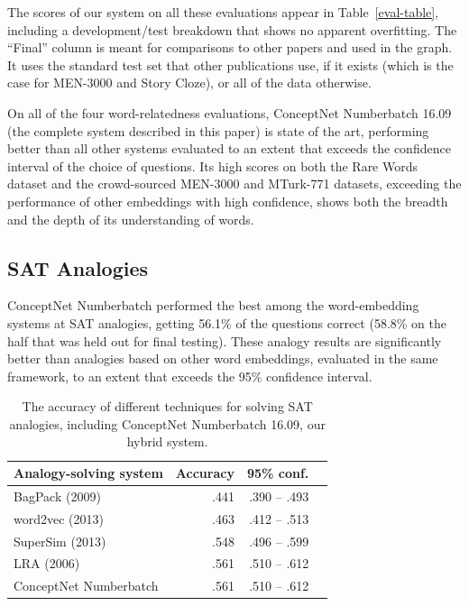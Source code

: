 \documentclass[letterpaper]{article}
\begin{document}
The scores of our system on all these evaluations appear in
Table~\ref{eval-table}, including a development/test breakdown that shows no
apparent overfitting. The ``Final'' column is meant for comparisons to other
papers and used in the graph. It uses the standard test set that other
publications use, if it exists (which is the case for MEN-3000 and Story
Cloze), or all of the data otherwise.

On all of the four word-relatedness evaluations, ConceptNet Numberbatch 16.09
(the complete system described in this paper) is state of the art, performing
better than all other systems evaluated to an extent that exceeds the
confidence interval of the choice of questions. Its high scores on both the
Rare Words dataset and the crowd-sourced MEN-3000 and MTurk-771 datasets,
exceeding the performance of other embeddings with high confidence, shows both
the breadth and the depth of its understanding of words.

\subsection{SAT Analogies}

ConceptNet Numberbatch performed the best among the word-embedding systems at
SAT analogies, getting 56.1\% of the questions correct (58.8\% on the half that
was held out for final testing).  These analogy results are significantly
better than analogies based on other word embeddings, evaluated in the same
framework, to an extent that exceeds the 95\% confidence interval.

\begin{table}[t]
\centering
\begin{tabular}{lrrr}
\bf Analogy-solving system   & \bf Accuracy & \bf 95\% conf. \\
\hline
    BagPack (2009)           & .441 & .390 -- .493 \\
    word2vec (2013)          & .463 & .412 -- .513 \\
    SuperSim (2013)          & .548 & .496 -- .599 \\
    LRA (2006)               & .561 & .510 -- .612 \\
    ConceptNet Numberbatch   & .561 & .510 -- .612
\end{tabular}
    \caption{The accuracy of different techniques for solving SAT analogies,
    including ConceptNet Numberbatch 16.09, our hybrid system.}
\label{analogy-eval-table}
\end{table}
\end{document}
